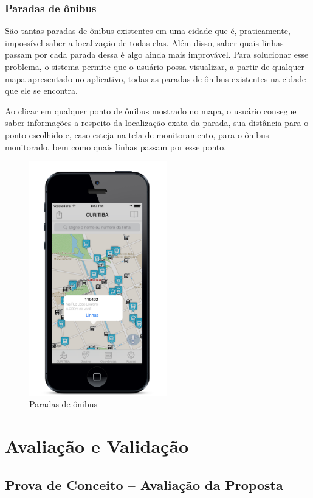 \subsection{Paradas de ônibus}

São tantas paradas de ônibus existentes em uma cidade que é, praticamente, impossível saber a localização de todas elas. Além disso, saber quais linhas passam por cada parada dessa é algo ainda mais improvável. Para solucionar esse problema, o sistema permite que o usuário possa visualizar, a partir de qualquer mapa apresentado no aplicativo, todas as paradas de ônibus existentes na cidade que ele se encontra.
	 
Ao clicar em qualquer ponto de ônibus mostrado no mapa, o usuário consegue saber informações a respeito da localização exata da parada, sua distância para o ponto escolhido e, caso esteja na tela de monitoramento, para o ônibus monitorado, bem como quais linhas passam por esse ponto.

\begin{figure}[htp]
\begin{center}
  \includegraphics[width=6cm]{images/telas/paradas.png}
  \caption{Paradas de ônibus}
  \label{fig:telaParadas}
\end{center}
\end{figure}


\chapter{Avaliação e Validação}
\label{ch:avaliacao}

\section{Prova de Conceito – Avaliação da Proposta}
\label{sc:provaConceito}

